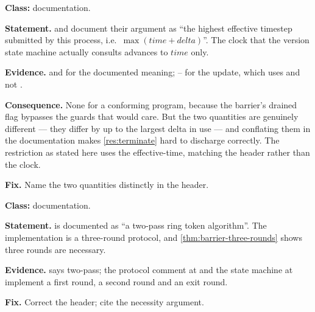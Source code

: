 \begin{deviation}
\label{dev:clock-conflation}
\textbf{Class:} documentation.

\textbf{Statement.}  and  document their
 argument as ``the highest effective timestep submitted by
this process, i.e.\ $\max(\mathit{time} + \mathit{delta})$''. The clock that the
version state machine actually consults advances to $\mathit{time}$ only.

\textbf{Evidence.}  and  for the
documented meaning; -- for the update,
which uses  and not .

\textbf{Consequence.} None for a conforming program, because the \gls{barrier}'s
drained flag bypasses the guards that would care. But the two quantities are
genuinely different --- they differ by up to the largest \gls{delta} in use --- and
conflating them in the documentation makes \cref{res:terminate} hard to
discharge correctly. The restriction as stated here uses the \gls{effective-time},
matching the header rather than the clock.

\textbf{Fix.} Name the two quantities distinctly in the header.
\end{deviation}

\begin{deviation}\label{dev:barrier-doc}
\textbf{Class:} documentation.

\textbf{Statement.}  is documented as ``a two-pass ring
token algorithm''. The implementation is a three-round protocol, and
\cref{thm:barrier-three-rounds} shows three rounds are necessary.

\textbf{Evidence.}  says two-pass; the protocol comment at
 and the state machine at
 implement a first round, a second round and an exit round.

\textbf{Fix.} Correct the header; cite the necessity argument.
\end{deviation}

